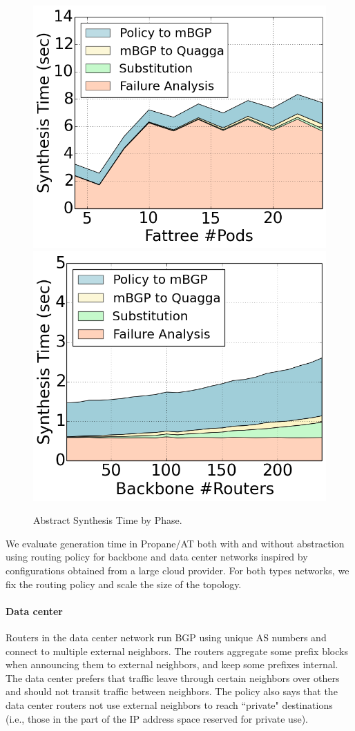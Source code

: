 \documentclass[numbers, 10pt, preprint]{sigplanconf}
\newcommand{\sysname}{{\text{}\small \sf Propane/AT}\xspace}
\newcommand{\para}[1]{\paragraph*{\textbf{#1}}}
\begin{document}
\begin{figure}[t!]
    {\includegraphics[width=.49\columnwidth]{figures/Fattree-analysis-time.png}}
    {\includegraphics[width=.49\columnwidth]{figures/backbone-analysis-time.png}} \\
  \vspace{-.6em}
  \caption{Abstract Synthesis Time by Phase. \label{fig:abstract-breakdown}}
  \vspace{-.4em}
\end{figure}


We evaluate generation time in \sysname both with and without abstraction using routing policy for backbone and data center networks inspired by configurations obtained from a large cloud provider. For both types networks, we fix the routing policy and scale the size of the topology.


\para{Data center}

Routers in the data center network run BGP using unique AS numbers and connect to multiple external neighbors. The routers aggregate some prefix blocks when announcing them to external neighbors, and keep some prefixes internal. The data center prefers that traffic leave through certain neighbors over others and should not transit traffic between neighbors. The policy also says that the data center routers not use external neighbors to reach ``private" destinations  (i.e., those in the part of the IP address space reserved for private use).
\end{document}
